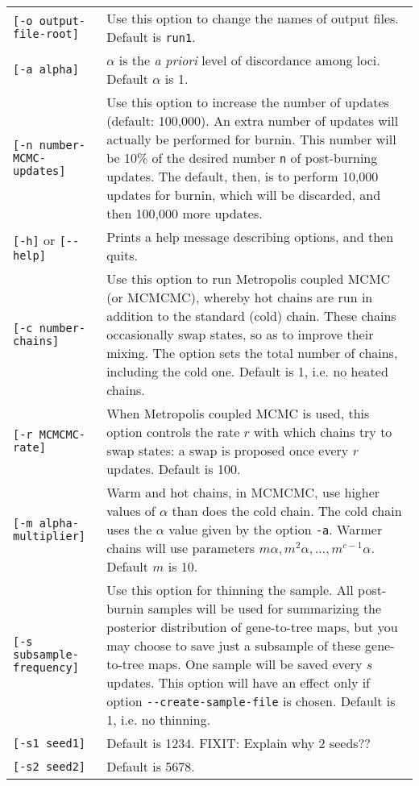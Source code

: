 \documentclass[12pt,english,final,letterpaper]{article}
\begin{document}
\hspace*{-1in}
\begin{tabular}{l|p{5in}}
{\tt [-o output-file-root]}&Use this option to change the names of output 
files. Default is {\tt run1}.\\
{\tt [-a alpha]}&$\alpha$ is the {\it a priori} level of discordance among 
loci. Default $\alpha$ is 1.\\
{\tt [-n number-MCMC-updates]}&Use this option to increase the number of 
updates (default: 100,000). An extra number of updates will actually be 
performed for burnin. This number will be 10\% of the desired number {\tt n} 
of post-burning updates. The default, then, is to perform 10,000 updates for 
burnin, which will be discarded, and then 100,000 more updates.\\
{\tt [-h]} or \verb+[--help]+&Prints a help message describing options, and
then quits.\\
{\tt [-c number-chains]}&Use this option to run Metropolis coupled MCMC (or MCMCMC), 
whereby hot chains are run in addition to the standard (cold) chain. 
These chains occasionally swap states, so as to improve their mixing. 
The option sets the total number of chains, including the cold one. 
Default is 1, i.e. no heated chains.\\
{\tt [-r MCMCMC-rate]}&When Metropolis coupled MCMC is used, this option
controls the rate $r$ with which chains try to swap states: a swap
is proposed once every $r$ updates. Default is 100.\\
{\tt [-m alpha-multiplier]}&Warm and hot chains, in MCMCMC, use higher values 
of $\alpha$ than does the cold chain. The cold chain uses the $\alpha$ value given
by the option {\tt -a}. Warmer chains will use parameters 
$m\alpha, m^2\alpha,\dots, m^{c-1}\alpha$. Default $m$ is 10.\\
{\tt [-s subsample-frequency]}&Use this option for thinning the sample. All post-burnin samples
will be used for summarizing the posterior distribution of gene-to-tree maps, 
but you may choose to save just a subsample of these gene-to-tree maps. One sample
will be saved every $s$ updates. This option will have an effect only if option
\verb+--create-sample-file+ is chosen. Default is 1, i.e. no thinning.\\
{\tt [-s1 seed1]}&Default is 1234. FIXIT: Explain why 2 seeds??\\
{\tt [-s2 seed2]}&Default is 5678.
\end{tabular}
\end{document}
